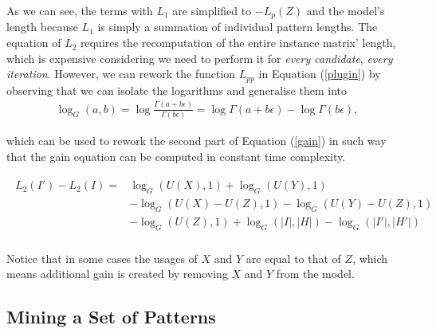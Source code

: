 \documentclass{llncs}
\begin{document}
As we can see, the terms with $L_1$ are simplified to $- L_p(Z)$ and the model's length because $L_1$ is simply a summation of individual pattern lengths. The equation of $L_2$ requires the recomputation of the entire instance matrix' length, which is expensive considering we need to perform it for \emph{every candidate}, \emph{every iteration}. However, we can rework the function $L_{pp}$ in Equation (\ref{plugin}) by observing that we can isolate the logarithms and generalise them into
\begin{align}
	\log_G(a,b) = \log \frac{\Gamma(a+ b\epsilon)}{\Gamma(b\epsilon)} = \log \Gamma(a+ b\epsilon) - \log \Gamma(b\epsilon),
\end{align} 

\noindent which can be used to rework the second part of Equation (\ref{gain}) in such way that the gain equation can be computed in constant time complexity.

\begin{align}
\begin{split}
	L_2(I') - L_2(I) = &\log_G(U(X),1) + \log_G(U(Y),1) \\
			      &- \log_G(U(X)-U(Z),1) - \log_G(U(Y)-U(Z),1) \\
			      &- \log_G(U(Z),1) + \log_G(|I|,|H|) - \log_G(|I'|,|H'|) \\
\end{split}   
\end{align}

\noindent Notice that in some cases the usages of $X$ and $Y$ are equal to that of $Z$, which means additional gain is created by removing $X$ and $Y$ from the model. 

\subsection{Mining a Set of Patterns}
\end{document}

